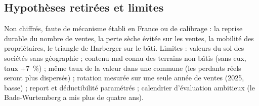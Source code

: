 \subsection{Hypothèses retirées et limites}

Non chiffrés, faute de mécanisme établi en France ou de calibrage : la reprise durable du nombre de ventes, la perte
sèche évitée sur les ventes, la mobilité des propriétaires, le triangle de Harberger sur le bâti. Limites : valeurs du
sol des sociétés sans géographie ; contenu mal connu des terrains non bâtis (sans eux, taux +7~\%) ; même taux de la
valeur dans une commune (les perdants réels seront plus dispersés) ; rotation mesurée sur une seule année de ventes
(2025, basse) ; report et déductibilité paramétrés ; calendrier d'évaluation ambitieux (le Bade-Wurtemberg a mis plus
de quatre ans).
